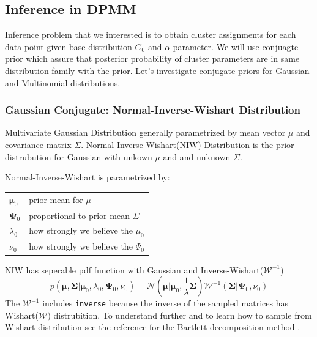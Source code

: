 \documentclass[a4paper]{article}
\begin{document}



\subsection{Inference in DPMM}

Inference problem that we interested is to obtain cluster assignments
for each data point given base distribution \(G_0\) and \(\alpha\)
parameter. We will use conjuagte prior which assure that posterior
probability of cluster parameters are in same distribution family with
the prior. Let's investigate conjugate priors for Gaussian and
Multinomial distributions.


\subsubsection{Gaussian Conjugate: Normal-Inverse-Wishart Distribution}

Multivariate Gaussian Distribution generally parametrized by mean vector
\(\mu\) and covariance matrix \(\Sigma\). Normal-Inverse-Wishart(NIW)
Distribution\cite{murphy2007conjugate} is the prior distrubution for Gaussian with unkown \(\mu\) and and
unknown \(\Sigma\).

Normal-Inverse-Wishart is parametrized by:

\begin{center}
\begin{tabular}{|l|l|}
\hline
 $\boldsymbol \mu_0$  & prior mean for $\mu$ \\ 
 $\boldsymbol \Psi_0$ & proportional to prior mean $\Sigma$\\
 $\lambda_0$ & how strongly we believe the  $\mu_0$\\
 $\nu_0$ & how strongly we believe the  $\Psi_0$\\ 
 \hline
\end{tabular}
\end{center}

NIW has seperable pdf function with Gaussian and
Inverse-Wishart(\(\mathcal{W}^{-1}\))
\begin{equation*}
p(\boldsymbol\mu,\boldsymbol\Sigma|\boldsymbol\mu_0,\lambda_0,\boldsymbol\Psi_0,\nu_0) = \mathcal{N}\left(\boldsymbol\mu\Big|\boldsymbol\mu_0,\frac{1}{\lambda}\boldsymbol\Sigma\right) \mathcal{W}^{-1}(\boldsymbol\Sigma|\boldsymbol\Psi_0,\nu_0)
\end{equation*}
The \(\mathcal{W}^{-1}\) includes \texttt{inverse} because the inverse
of the sampled matrices has Wishart(\(\mathcal{W}\)) distrubition. To
understand further and to learn how to sample from Wishart distribution
see the reference for the Bartlett decomposition method \cite{wishart1928generalised}.
\end{document}
